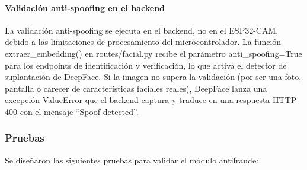 \paragraph{Validación anti-spoofing en el backend}

La validación anti-spoofing se ejecuta en el backend, no en el ESP32-CAM, debido a las limitaciones de procesamiento del microcontrolador. La función extraer\_embedding() en routes/facial.py recibe el parámetro anti\_spoofing=True para los endpoints de identificación y verificación, lo que activa el detector de suplantación de DeepFace. Si la imagen no supera la validación (por ser una foto, pantalla o carecer de características faciales reales), DeepFace lanza una excepción ValueError que el backend captura y traduce en una respuesta HTTP 400 con el mensaje ``Spoof detected''.

\subsubsection{Pruebas}

Se diseñaron las siguientes pruebas para validar el módulo antifraude:


